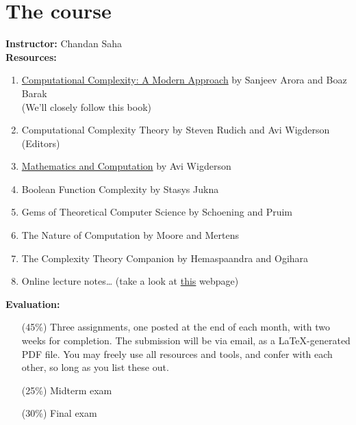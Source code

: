 \chapter*{The course}

\textbf{Instructor:} Chandan Saha
\\[1em]
\textbf{Resources:}
\begin{enumerate}
    \item \href{https://www.cs.princeton.edu/theory/complexity/}{Computational Complexity: A Modern Approach}
        by Sanjeev Arora and Boaz Barak \\
        (We'll closely follow this book)
    \item Computational Complexity Theory by Steven Rudich and Avi Wigderson
        (Editors)
    \item \href{https://www.math.ias.edu/files/Book-online-Aug0619.pdf}{Mathematics and Computation}
        by Avi Wigderson
    \item Boolean Function Complexity by Stasys Jukna
    \item Gems of Theoretical Computer Science by Schoening and Pruim
    \item The Nature of Computation by Moore and Mertens
    \item The Complexity Theory Companion by Hemaspaandra and Ogihara
    \item Online lecture notes\dots{}
        (take a look at \href{https://www.cs.cmu.edu/~odonnell/complexity/}{this} webpage)
\end{enumerate}
\vspace{1em}
\textbf{Evaluation:}
\begin{itemize}
    \item[(45\%)] Three assignments, one posted at the end of each month,
        with two weeks for completion.
        The submission will be via email, as a \LaTeX-generated PDF file.
        You may freely use all resources and tools, and confer with each
        other, so long as you list these out.
    \item[(25\%)] Midterm exam
    \item[(30\%)] Final exam
\end{itemize}

